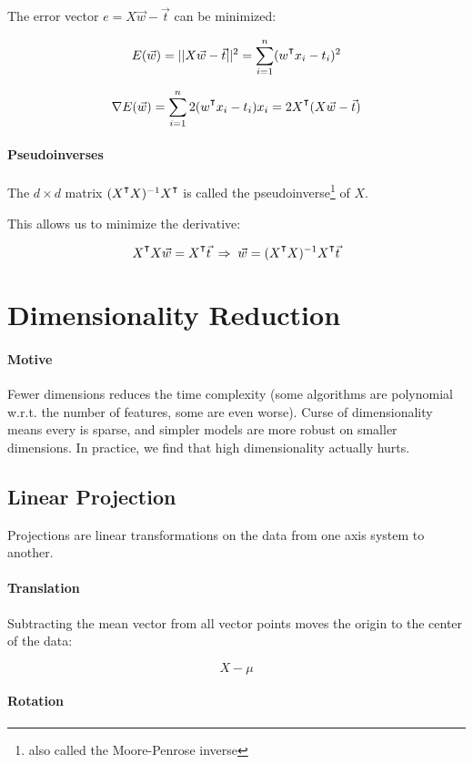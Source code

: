 \documentclass{idc_msc}
\renewcommand{\T}{{\mathpalette\raiseT\intercal}} %
\begin{document}
The error vector \(e = X \vec{w} - \vec{t}\) can be minimized:

\[E(\vec{w}) = || X \vec{w} - \vec{t} ||^2 = \sum_{i=1}^n (w^\T x_i - t_i)^2\]

\[\nabla E(\vec{w}) = \sum_{i=1}^n 2 (w^\T x_i - t_i)x_i = 2X^\T (X \vec{w} - \vec{t})\]

\paragraph{Pseudoinverses}

The \(d \times d\) matrix \((X^\T X)^{-1}X^\T\) is called the pseudoinverse\footnote{also called the Moore-Penrose inverse} of \(X\).

This allows us to minimize the derivative:

\[X^\T X \vec{w} = X^\T \vec{t} \; \Rightarrow \; \vec{w} = (X^\T X)^{-1}X^\T \vec{t}\]

\section{Dimensionality Reduction}

\paragraph{Motive}

Fewer dimensions reduces the time complexity (some algorithms are polynomial w.r.t. the number of features, some are even worse).
Curse of dimensionality means every is sparse, and simpler models are more robust on smaller dimensions.
In practice, we find that high dimensionality actually hurts.

\subsection{Linear Projection}

Projections are linear transformations on the data from one axis system to another.

\paragraph{Translation}

Subtracting the mean vector from all vector points moves the origin to the center of the data:

\[X - \mu\]

\paragraph{Rotation}
\end{document}
